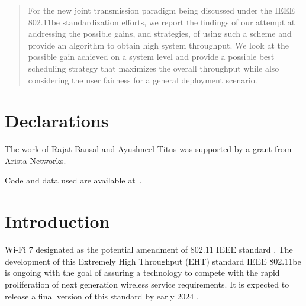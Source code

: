 \begin{abstract}
For the new joint transmission paradigm being discussed under the IEEE 802.11be standardization efforts, we report the findings of our attempt at addressing the possible gains, and strategies, of using such a scheme and provide an algorithm to obtain high system throughput. We look at the possible gain achieved on a system level and provide a possible best scheduling strategy that maximizes the overall throughput while also considering the user fairness for a general deployment scenario.

\end{abstract}


\section{Declarations}

The work of Rajat Bansal and Ayushneel Titus was supported by a grant from Arista Networks.

\noindent
Code and data used are available at~\cite{code:onlineSchedulingJT}.











\section{Introduction}
Wi-Fi 7 designated as the potential amendment of 802.11 IEEE standard \cite{wifi7challenges}. The development of this Extremely High Throughput (EHT) standard IEEE 802.11be  is ongoing with the goal of assuring a technology to compete with the rapid proliferation of next generation wireless service requirements. It is expected to release a final version of this standard by early 2024 \cite{IEEE_TSG}. 

